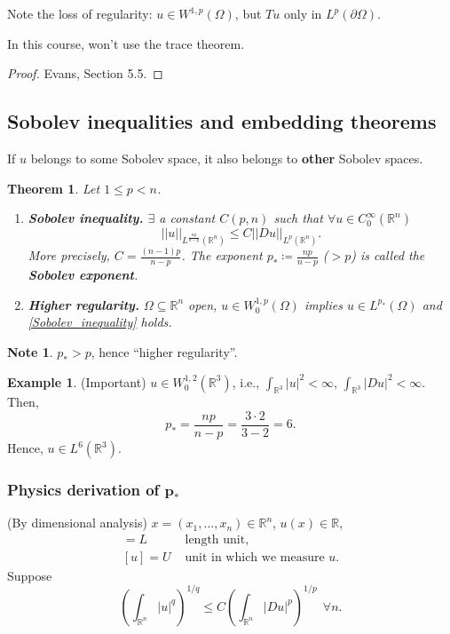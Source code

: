 \documentclass[12pt]{article}
\newtheorem{theorem}{Theorem}[section]
\theoremstyle{definition}
\newtheorem*{note}{Note}
\newtheorem*{example*}{Example}
\begin{document}
Note the loss of regularity: $u\in W^{1,p}(\Omega)$, but $Tu$ only in $L^p(\partial\Omega)$.

In this course, won't use the trace theorem.

\begin{proof}
\cite{evans2010partial} Evans, Section 5.5.
\end{proof}

\subsection{Sobolev inequalities and embedding theorems}
If $u$ belongs to some Sobolev space, it also belongs to \textbf{other} Sobolev spaces.

\begin{theorem}
Let $1\leq p<n$.
\begin{enumerate}[label=\alph*)]
\item \textbf{Sobolev inequality.} $\exists$ a constant $C(p,n)$ such that $\forall u\in C_0^{\infty}(\mathbb{R}^n)$
\begin{equation}\tag{S}\label{Sobolev_inequality}
||u||_{L^{\frac{np}{n-p}}(\mathbb{R}^n)}\leq C||Du||_{L^p(\mathbb{R}^n)}.
\end{equation}
More precisely, $C=\frac{(n-1)p}{n-p}$. The exponent $p_*\coloneqq\frac{np}{n-p}$ ($>p$) is called the \textbf{Sobolev exponent}.

\item \textbf{Higher regularity.} $\Omega\subseteq\mathbb{R}^n$ open, $u\in W_0^{1,p}(\Omega)$ implies $u\in L^{p_*}(\Omega)$ and \eqref{Sobolev_inequality} holds.
\end{enumerate}
\end{theorem}

\begin{note}
$p_*>p$, hence ``higher regularity''.
\end{note}

\begin{example*}
(Important) $u\in W_0^{1,2}(\mathbb{R}^3)$, i.e., $\int_{\mathbb{R}^3}|u|^2<\infty$, $\int_{\mathbb{R}^3}|Du|^2<\infty$. Then,
\[p_*=\frac{np}{n-p}=\frac{3\cdot2}{3-2}=6.\]
Hence, $u\in L^6(\mathbb{R}^3)$.
\end{example*}

\subsubsection*{Physics derivation of $\boldsymbol{p_*}$}
(By dimensional analysis) $x=(x_1,\ldots,x_n)\in\mathbb{R}^n$, $u(x)\in\mathbb{R}$,
\begin{align*}
[x_j]=L&\text{ length unit},\\
[u]=U&\text{ unit in which we measure }u.
\end{align*}
Suppose
\[\left(\int_{\mathbb{R}^n}|u|^q\right)^{1/q}\leq C\left(\int_{\mathbb{R}^n}|Du|^p\right)^{1/p}\ \ \forall n.\]
\end{document}
